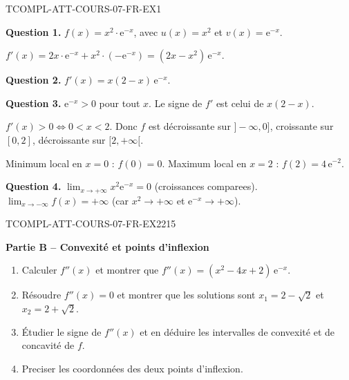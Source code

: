 \begin{corrige}{TCOMPL-ATT-COURS-07-FR-EX1}

\textbf{Question 1.} $f(x) = x^2 \cdot \mathrm{e}^{-x}$, avec $u(x) = x^2$ et $v(x) = \mathrm{e}^{-x}$.

$f'(x) = 2x \cdot \mathrm{e}^{-x} + x^2 \cdot (-\mathrm{e}^{-x}) = (2x - x^2)\,\mathrm{e}^{-x}$.

\textbf{Question 2.} $f'(x) = x(2-x)\,\mathrm{e}^{-x}$.

\textbf{Question 3.} $\mathrm{e}^{-x} > 0$ pour tout $x$. Le signe de $f'$ est celui de $x(2-x)$.

$f'(x) > 0 \iff 0 < x < 2$. Donc $f$ est décroissante sur $]-\infty, 0]$, croissante sur $[0, 2]$, décroissante sur $[2, +\infty[$.

Minimum local en $x = 0$ : $f(0) = 0$. Maximum local en $x = 2$ : $f(2) = 4\,\mathrm{e}^{-2}$.

\textbf{Question 4.} $\lim_{x \to +\infty} x^2 \mathrm{e}^{-x} = 0$ (croissances comparees). $\lim_{x \to -\infty} f(x) = +\infty$ (car $x^2 \to +\infty$ et $\mathrm{e}^{-x} \to +\infty$).

\end{corrige}

\bigskip


\begin{exercice}{TCOMPL-ATT-COURS-07-FR-EX2}{2}{15}

\textbf{Partie B -- Convexité et points d'inflexion}

\begin{enumerate}
  \item Calculer $f''(x)$ et montrer que $f''(x) = (x^2 - 4x + 2)\,\mathrm{e}^{-x}$.
  \item Résoudre $f''(x) = 0$ et montrer que les solutions sont $x_1 = 2 - \sqrt{2}$ et $x_2 = 2 + \sqrt{2}$.
  \item Étudier le signe de $f''(x)$ et en déduire les intervalles de convexité et de concavité de $f$.
  \item Preciser les coordonnées des deux points d'inflexion.
\end{enumerate}

\end{exercice}

